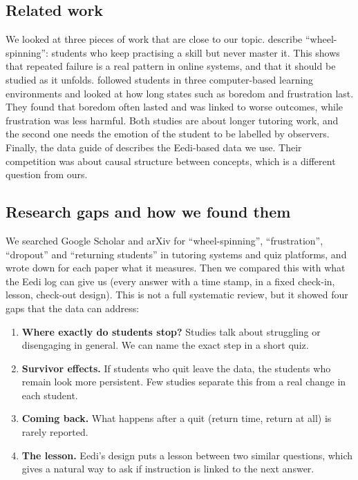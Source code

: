 \documentclass[11pt,a4paper]{article}
\begin{document}
\subsection{Related work}
We looked at three pieces of work that are close to our topic. \citet{beck2013wheel} describe ``wheel-spinning'': students who keep practising a skill but never master it. This shows that repeated failure is a real pattern in online systems, and that it should be studied as it unfolds. \citet{baker2010frustrated} followed students in three computer-based learning environments and looked at how long states such as boredom and frustration last. They found that boredom often lasted and was linked to worse outcomes, while frustration was less harmful. Both studies are about longer tutoring work, and the second one needs the emotion of the student to be labelled by observers. Finally, the data guide of \citet{gong2022causal} describes the Eedi-based data we use. Their competition was about causal structure between concepts, which is a different question from ours.

\subsection{Research gaps and how we found them}
We searched Google Scholar and arXiv for ``wheel-spinning'', ``frustration'', ``dropout'' and ``returning students'' in tutoring systems and quiz platforms, and wrote down for each paper what it measures. Then we compared this with what the Eedi log can give us (every answer with a time stamp, in a fixed check-in, lesson, check-out design). This is not a full systematic review, but it showed four gaps that the data can address:
\begin{enumerate}
\item \textbf{Where exactly do students stop?} Studies talk about struggling or disengaging in general. We can name the exact step in a short quiz.
\item \textbf{Survivor effects.} If students who quit leave the data, the students who remain look more persistent. Few studies separate this from a real change in each student.
\item \textbf{Coming back.} What happens after a quit (return time, return at all) is rarely reported.
\item \textbf{The lesson.} Eedi's design puts a lesson between two similar questions, which gives a natural way to ask if instruction is linked to the next answer.
\end{enumerate}
\end{document}
